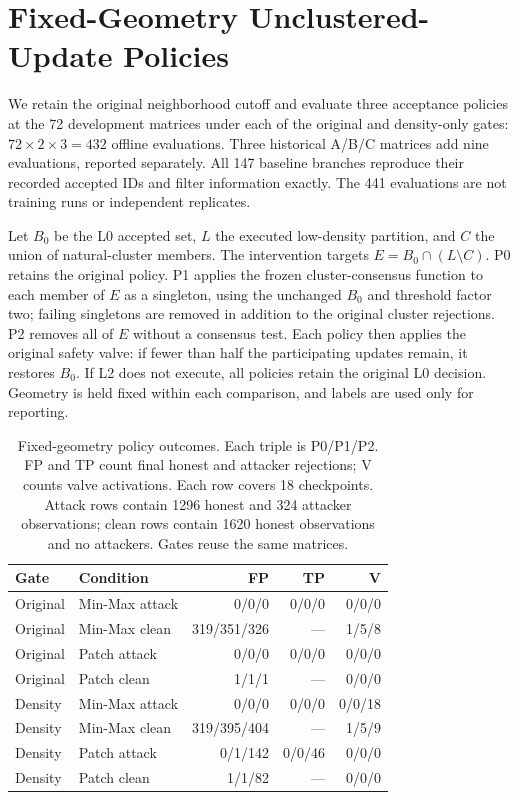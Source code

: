 \documentclass[journal]{IEEEtran}
\begin{document}
\section{Fixed-Geometry Unclustered-Update Policies}
We retain the original neighborhood cutoff and evaluate three acceptance policies at the 72 development matrices under each of the original and density-only gates: $72\times2\times3=432$ offline evaluations. Three historical A/B/C matrices add nine evaluations, reported separately. All 147 baseline branches reproduce their recorded accepted IDs and filter information exactly. The 441 evaluations are not training runs or independent replicates.

Let $B_0$ be the L0 accepted set, $L$ the executed low-density partition, and $C$ the union of natural-cluster members. The intervention targets $E=B_0\cap(L\setminus C)$. P0 retains the original policy. P1 applies the frozen cluster-consensus function to each member of $E$ as a singleton, using the unchanged $B_0$ and threshold factor two; failing singletons are removed in addition to the original cluster rejections. P2 removes all of $E$ without a consensus test. Each policy then applies the original safety valve: if fewer than half the participating updates remain, it restores $B_0$. If L2 does not execute, all policies retain the original L0 decision. Geometry is held fixed within each comparison, and labels are used only for reporting.

\begin{table}[!t]
\centering\scriptsize
\caption{Fixed-geometry policy outcomes. Each triple is P0/P1/P2. FP and TP count final honest and attacker rejections; V counts valve activations. Each row covers 18 checkpoints. Attack rows contain 1296 honest and 324 attacker observations; clean rows contain 1620 honest observations and no attackers. Gates reuse the same matrices.}\label{tab:unclustered_policy}
\setlength{\tabcolsep}{3pt}
\begin{tabular}{llrrr}\toprule
Gate & Condition & FP & TP & V\\\midrule
Original & Min-Max attack & 0/0/0 & 0/0/0 & 0/0/0 \\
Original & Min-Max clean & 319/351/326 & --- & 1/5/8 \\
Original & Patch attack & 0/0/0 & 0/0/0 & 0/0/0 \\
Original & Patch clean & 1/1/1 & --- & 0/0/0 \\
Density & Min-Max attack & 0/0/0 & 0/0/0 & 0/0/18 \\
Density & Min-Max clean & 319/395/404 & --- & 1/5/9 \\
Density & Patch attack & 0/1/142 & 0/0/46 & 0/0/0 \\
Density & Patch clean & 1/1/82 & --- & 0/0/0 \\
\bottomrule\end{tabular}
\end{table}
\end{document}
